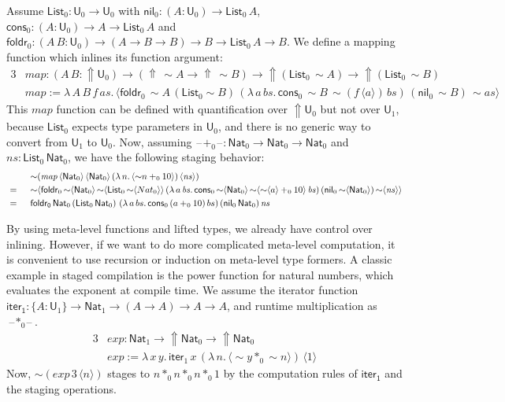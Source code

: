 \documentclass[acmsmall,anonymous,review]{acmart}
\newcommand{\mit}[1]{\mathit{#1}}
\newcommand{\msf}[1]{\mathsf{#1}}
\newcommand{\Lift}{{\Uparrow}}
\newcommand{\spl}{{\sim}}
\newcommand{\qut}[1]{\langle #1\rangle}
\renewcommand{\U}{\msf{U}}
\newcommand{\List}{\msf{List}}
\newcommand{\nil}{\msf{nil}}
\newcommand{\cons}{\msf{cons}}
\newcommand{\Nat}{\msf{Nat}}
\newcommand{\blank}{{\mathord{\hspace{1pt}\text{--}\hspace{1pt}}}}
\theoremstyle{remark}
\begin{document}
Assume $\List_0 : \U_0 \to \U_0$ with $\nil_0 : (A : \U_0) \to \List_0\,A$,
$\cons_0 : (A : \U_0) \to A \to \List_0\,A$ and $\msf{foldr}_0 : (A\,B : \U_0)
\to (A \to B \to B) \to B \to \List_0\,A \to B$. We define a mapping function which
inlines its function argument:
\begin{alignat*}{3}
  & \mit{map} : (A\,B : \Lift\U_0) \to (\Lift\,\spl A \to \Lift\,\spl B)
      \to \Lift(\List_0\,\spl A) \to \Lift(\List_0\,\spl B)\\
  & \mit{map} := \lambda\,A\,B\,f\,\mit{as}.\,
      \qut{\msf{foldr}_0\,
        \spl A\,(\List_0 \spl B)\,
        (\lambda\,a\,\mit{bs}.\, \cons_0\,\spl B\,\spl(f\,\qut{a})\,\mit{bs})\,
        (\nil_0\,\spl B)\,
        \spl as
        }
\end{alignat*}
This $\mit{map}$ function can be defined with quantification over $\Lift \U_0$ but not
over $\U_1$, because $\List_0$ expects type parameters in $\U_0$, and there is
no generic way to convert from $\U_1$ to $\U_0$. Now, assuming
$\blank\!+_0\!\blank : \Nat_0 \to \Nat_0 \to \Nat_0$ and $\mit{ns} :
\List_0\,\Nat_0$, we have the following staging behavior:
\begin{alignat*}{3}
  & &&\spl(\mit{map}\,\qut{\Nat_0}\,\qut{\Nat_0}\,(\lambda\,n.\,\qut{\spl n +_0 10})\,\qut{\mit{ns}})\\
  & =\hspace{0.5em}&&\spl\qut{\msf{foldr}_0\,
        \spl \qut{\Nat_0}\,\spl \qut{\List_0\,\spl\qut{Nat_0}}\,
        (\lambda\,a\,\mit{bs}.\, \cons_0\,\spl\qut{\Nat_0}\,\spl\qut{\spl\qut{a} +_0 10}\,\mit{bs})\,
        (\nil_0\,\spl \qut{\Nat_0})\,
        \spl\qut{\mit{ns}}}\\
  & =\hspace{0.5em} &&\msf{foldr_0}\,\Nat_0\,(\List_0\,\Nat_0)\,\,(\lambda\,a\,bs.\,\cons_0\,(a +_0 10)\,bs)\,(\nil_0\,\Nat_0)\,\mit{ns}
\end{alignat*}

By using meta-level functions and lifted types, we already have control over
inlining. However, if we want to do more complicated meta-level computation, it
is convenient to use recursion or induction on meta-level type formers. A
classic example in staged compilation is the power function for natural numbers,
which evaluates the exponent at compile time. We assume the iterator function
$\msf{iter_1} : \{A : \U_1\} \to \Nat_1 \to (A \to A) \to A \to A$, and runtime
multiplication as $\blank\!*_0\!\blank$.
\begin{alignat*}{3}
  &\mit{exp} : \Nat_1 \to \Lift \Nat_0 \to \Lift \Nat_0 \\
  &\mit{exp} := \lambda\,x\,y.\,
  \msf{iter}_1\,x\,(\lambda\,n.\,\qut{\spl y *_0 \spl n})\,\qut{1}
\end{alignat*}
Now, $\spl(\mit{exp}\,3\,\qut{n})$ stages to $n *_0 n *_0 n *_0 1$ by the computation rules
of $\msf{iter_1}$ and the staging operations.
\end{document}
